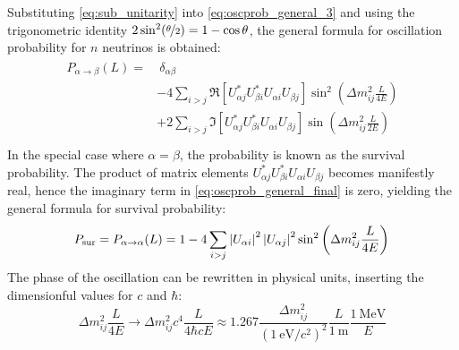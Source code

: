 Substituting \cref{eq:sub_unitarity} into \cref{eq:oscprob_general_3}
and using the trigonometric identity $2\sin^2(\nicefrac{\theta}{2}) = 1 - \cos\theta$,
the general formula for oscillation probability for $n$ neutrinos is obtained:
\begin{align}\label{eq:oscprob_general_final}
    \begin{split}
        P_{\alpha\to\beta}(L) =
        &\ \delta_{\alpha\beta} \\
        & - 4\sum_{i>j} \Re \left[
            U^*_{\alpha j} U^*_{\beta i} U_{\alpha i} U_{\beta j}
        \right]
        \sin^2\left(\Delta m^2_{ij}\frac{L}{4E}\right) \\
        & + 2\sum_{i>j} \Im \left[
            U^*_{\alpha j} U^*_{\beta i} U_{\alpha i} U_{\beta j}
        \right]
        \sin\left(\Delta m^2_{ij}\frac{L}{2E}\right) \\
    \end{split}
\end{align}
In the special case where $\alpha = \beta$, the probability
is known as the survival probability.
The product of matrix elements
$U^*_{\alpha j} U^*_{\beta i} U_{\alpha i} U_{\beta j}$
becomes manifestly real,
hence the imaginary term in \cref{eq:oscprob_general_final} is zero,
yielding the general formula for survival probability:
\begin{equation}\label{eq:survival_prob_general}
        P_{\text{sur}} = P_{\alpha\to\alpha}(L) =
        1 - 4\sum_{i>j}
        \left|U_{\alpha i}\right|^2
        \left|U_{\alpha j}\right|^2
        \sin^2\left(\Delta m^2_{ij}\frac{L}{4E}\right) \\
\end{equation}
The phase of the oscillation can be rewritten in physical units,
inserting the dimensionful values for $c$ and $\hbar$:
\begin{equation}\label{eq:osc_phase_shorthand}
    \Delta m^2_{ij}\frac{L}{4E} \to
    \Delta m^2_{ij} c^4 \frac{L}{4\hbar cE}
    \approx 1.267
    \frac{\Delta m^2_{ij}}{(\SI{1}{\eV}/c^2)^2}
    \frac{L}{\SI{1}{\m}}
    \frac{\SI{1}{\MeV}}{E}
\end{equation}

